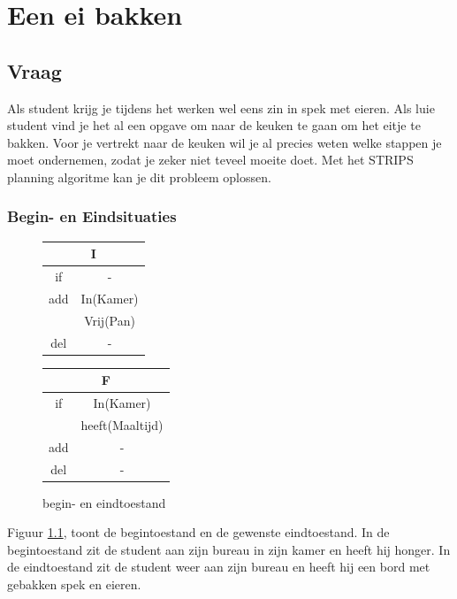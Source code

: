 \documentclass[alternative-exam.tex]{subfiles}
\begin{document}
\chapter{Een ei bakken}
\section{Vraag}
Als student krijg je tijdens het werken wel eens zin in spek met eieren. Als luie student vind je het al een opgave om naar de keuken te gaan om het eitje te bakken. Voor je vertrekt naar de keuken wil je al precies weten welke stappen je moet ondernemen, zodat je zeker niet teveel moeite doet. Met het STRIPS planning algoritme kan je dit probleem oplossen.

\subsection{Begin- en Eindsituaties}
\begin{figure}[H]
\centering
\begin{tabular}{|c|c|}
    \multicolumn{2}{c}{I}\\
    \hline
    if & -\\
    \hline
    add & In(Kamer)\\
        & Vrij(Pan)\\
    \hline
    del & -\\
    \hline
\end{tabular}
\hspace{0.25 cm}
\begin{tabular}{|c|c|}
    \multicolumn{2}{c}{F}\\
    \hline
    if & In(Kamer)\\
    & heeft(Maaltijd)\\
    \hline
    add & -\\
    \hline
    del & -\\
    \hline
\end{tabular}
\caption{begin- en eindtoestand}
\label{ienf}
\end{figure}
Figuur \ref{ienf}, toont de begintoestand en de gewenste eindtoestand. In de begintoestand zit de student aan zijn bureau in zijn kamer en heeft hij honger. In de eindtoestand zit de student weer aan zijn bureau en heeft hij een bord met gebakken spek en eieren.
\end{document}
